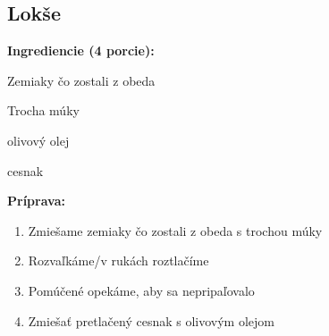 \setcounter{step}{0}

\subsection{ Lokše }

\begin{ingredient}
  
  \def\portions{  }
  \textbf{ {\normalsize Ingrediencie (4 porcie):} }

  \begin{main}
      \item Zemiaky čo zostali z obeda
      \item Trocha múky
      \item olivový olej
      \item cesnak
  \end{main}
  
\end{ingredient}
\begin{recipe}
\textbf{ {\normalsize Príprava:} }
\begin{enumerate}

  \item{Zmiešame zemiaky čo zostali z obeda s trochou múky}
  \item{Rozvaľkáme/v rukách roztlačíme}
  \item{Pomúčené opekáme, aby sa nepripaľovalo}
  \item{Zmiešať pretlačený cesnak s olivovým olejom}

\end{enumerate}
\end{recipe}

\begin{notes}
  
\end{notes}	
\clearpage
